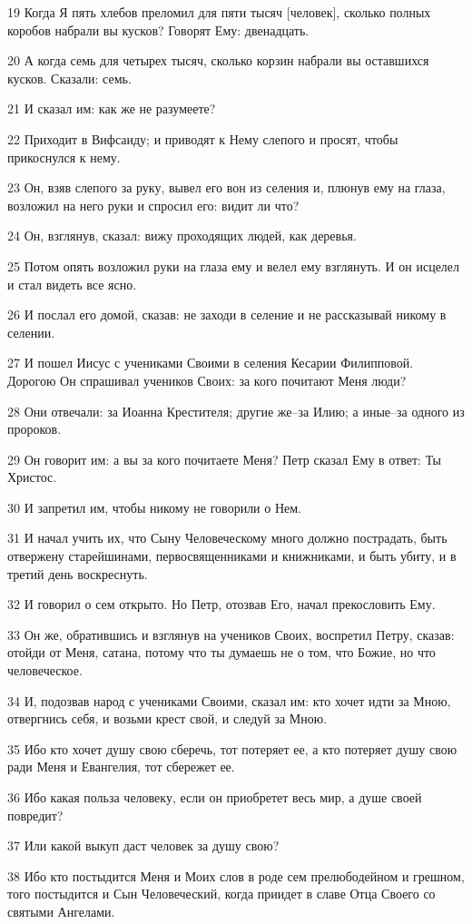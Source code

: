 \par 19 Когда Я пять хлебов преломил для пяти тысяч [человек], сколько полных коробов набрали вы кусков? Говорят Ему: двенадцать.
\par 20 А когда семь для четырех тысяч, сколько корзин набрали вы оставшихся кусков. Сказали: семь.
\par 21 И сказал им: как же не разумеете?
\par 22 Приходит в Вифсаиду; и приводят к Нему слепого и просят, чтобы прикоснулся к нему.
\par 23 Он, взяв слепого за руку, вывел его вон из селения и, плюнув ему на глаза, возложил на него руки и спросил его: видит ли что?
\par 24 Он, взглянув, сказал: вижу проходящих людей, как деревья.
\par 25 Потом опять возложил руки на глаза ему и велел ему взглянуть. И он исцелел и стал видеть все ясно.
\par 26 И послал его домой, сказав: не заходи в селение и не рассказывай никому в селении.
\par 27 И пошел Иисус с учениками Своими в селения Кесарии Филипповой. Дорогою Он спрашивал учеников Своих: за кого почитают Меня люди?
\par 28 Они отвечали: за Иоанна Крестителя; другие же--за Илию; а иные--за одного из пророков.
\par 29 Он говорит им: а вы за кого почитаете Меня? Петр сказал Ему в ответ: Ты Христос.
\par 30 И запретил им, чтобы никому не говорили о Нем.
\par 31 И начал учить их, что Сыну Человеческому много должно пострадать, быть отвержену старейшинами, первосвященниками и книжниками, и быть убиту, и в третий день воскреснуть.
\par 32 И говорил о сем открыто. Но Петр, отозвав Его, начал прекословить Ему.
\par 33 Он же, обратившись и взглянув на учеников Своих, воспретил Петру, сказав: отойди от Меня, сатана, потому что ты думаешь не о том, что Божие, но что человеческое.
\par 34 И, подозвав народ с учениками Своими, сказал им: кто хочет идти за Мною, отвергнись себя, и возьми крест свой, и следуй за Мною.
\par 35 Ибо кто хочет душу свою сберечь, тот потеряет ее, а кто потеряет душу свою ради Меня и Евангелия, тот сбережет ее.
\par 36 Ибо какая польза человеку, если он приобретет весь мир, а душе своей повредит?
\par 37 Или какой выкуп даст человек за душу свою?
\par 38 Ибо кто постыдится Меня и Моих слов в роде сем прелюбодейном и грешном, того постыдится и Сын Человеческий, когда приидет в славе Отца Своего со святыми Ангелами.

